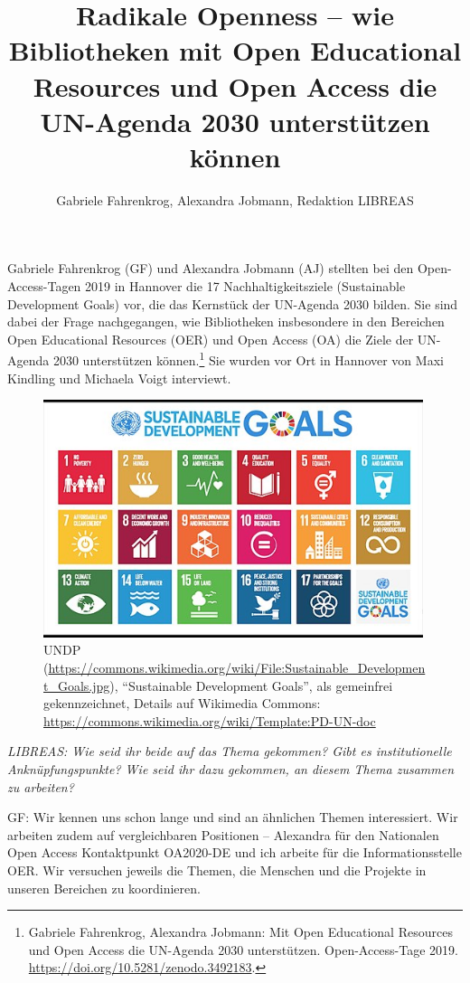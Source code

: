 \documentclass[a4paper,
fontsize=11pt,
oneside,
numbers=noperiodatend,
parskip=half-,
bibliography=totoc,
final
]{scrartcl}
\title{\LARGE{Radikale Openness -- wie Bibliotheken mit Open Educational Resources und Open Access die UN-Agenda 2030 unterstützen können}} %
\author{Gabriele Fahrenkrog, Alexandra Jobmann, Redaktion LIBREAS} %
\date{}
\begin{document}
\maketitle
\thispagestyle{fancyplain} 


Gabriele Fahrenkrog (GF) und Alexandra Jobmann (AJ) stellten bei den
Open-Access-Tagen 2019 in Hannover die 17 Nachhaltigkeitsziele
(Sustainable Development Goals) vor, die das Kernstück der UN-Agenda
2030 bilden. Sie sind dabei der Frage nachgegangen, wie Bibliotheken
insbesondere in den Bereichen Open Educational Resources (OER) und Open
Access (OA) die Ziele der UN-Agenda 2030 unterstützen können.\footnote{Gabriele
  Fahrenkrog, Alexandra Jobmann: Mit Open Educational Resources und Open
  Access die UN-Agenda 2030 unterstützen. Open-Access-Tage 2019.
  \url{https://doi.org/10.5281/zenodo.3492183}.} Sie wurden vor Ort in
Hannover von Maxi Kindling und Michaela Voigt interviewt.

\begin{figure}[h!]
\centering
\includegraphics[width=30em]{SDG.jpg}
\caption{UNDP
(\url{https://commons.wikimedia.org/wiki/File:Sustainable_Development_Goals.jpg}),
\enquote{Sustainable Development Goals}, als gemeinfrei gekennzeichnet,
Details auf Wikimedia Commons:
\url{https://commons.wikimedia.org/wiki/Template:PD-UN-doc}}
\end{figure}

\emph{LIBREAS: Wie seid ihr beide auf das Thema gekommen? Gibt es
institutionelle Anknüpfungspunkte? Wie seid ihr dazu gekommen, an diesem
Thema zusammen zu arbeiten?}

GF: Wir kennen uns schon lange und sind an ähnlichen Themen
interessiert. Wir arbeiten zudem auf vergleichbaren Positionen --
Alexandra für den Nationalen Open Access Kontaktpunkt OA2020-DE und ich
arbeite für die Informationsstelle OER. Wir versuchen jeweils die
Themen, die Menschen und die Projekte in unseren Bereichen zu
koordinieren.
\end{document}
